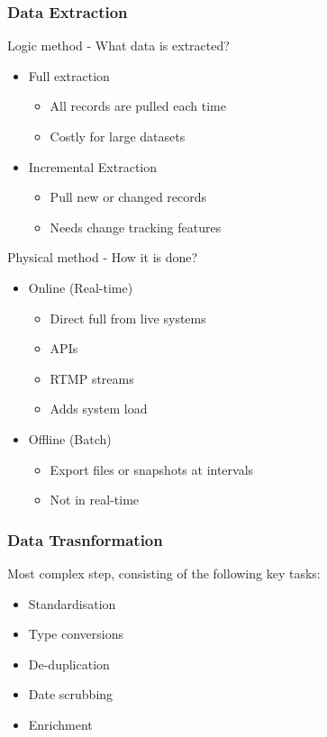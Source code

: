 \documentclass[a5paper]{article}
\begin{document}
	\subsubsection{Data Extraction}
	Logic method - What data is extracted?
	\begin{itemize}
		\item Full extraction
			\begin{itemize}
				\item All records are pulled each time
				\item Costly for large datasets
			\end{itemize}
		\item Incremental Extraction
			\begin{itemize}
				\item Pull new or changed records
				\item Needs change tracking features
			\end{itemize}
	\end{itemize}
	Physical method - How it is done?
	\begin{itemize}
		\item Online (Real-time)
			\begin{itemize}
				\item Direct full from live systems
				\item APIs
				\item RTMP streams
				\item Adds system load
			\end{itemize}
		\item Offline (Batch)
			\begin{itemize}
				\item Export files or snapshots at intervals
				\item Not in real-time
			\end{itemize}
	\end{itemize}
	\subsubsection{Data Trasnformation}
	Most complex step, consisting of the following key tasks:
	\begin{itemize}
		\item Standardisation
		\item Type conversions
		\item De-duplication
		\item Date scrubbing
		\item Enrichment
	\end{itemize}
\end{document}
